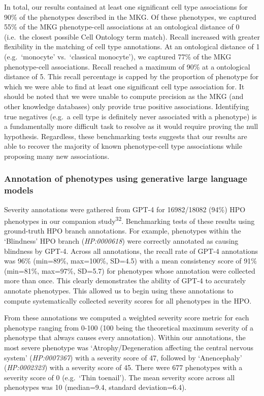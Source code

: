 \documentclass[
]{article}
\begin{document}
In total, our results contained at least one significant cell type
associations for 90\% of the phenotypes described in the MKG. Of these
phenotypes, we captured 55\% of the MKG phenotype-cell associations at
an ontological distance of 0 (i.e.~the closest possible Cell Ontology
term match). Recall increased with greater flexibility in the matching
of cell type annotations. At an ontological distance of 1
(e.g.~`monocyte' vs.~`classical monocyte'), we captured 77\% of the MKG
phenotype-cell associations. Recall reached a maximum of 90\% at a
ontological distance of 5. This recall percentage is capped by the
proportion of phenotype for which we were able to find at least one
significant cell type association for. It should be noted that we were
unable to compute precision as the MKG (and other knowledge databases)
only provide true positive associations. Identifying true negatives
(e.g.~a cell type is definitely never associated with a phenotype) is a
fundamentally more difficult task to resolve as it would require proving
the null hypothesis. Regardless, these benchmarking tests suggests that
our results are able to recover the majority of known phenotype-cell
type associations while proposing many new associations.

\subsubsection{Annotation of phenotypes using generative large language
models}\label{annotation-of-phenotypes-using-generative-large-language-models}

Severity annotations were gathered from GPT-4 for 16982/18082 (94\%) HPO
phenotypes in our companion study\textsuperscript{32}. Benchmarking
tests of these results using ground-truth HPO branch annotations. For
example, phenotypes within the `Blindness' HPO branch
(\emph{HP:0000618}) were correctly annotated as causing blindness by
GPT-4. Across all annotations, the recall rate of GPT-4 annotations was
96\% (min=89\%, max=100\%, SD=4.5) with a mean consistency score of 91\%
(min=81\%, max=97\%, SD=5.7) for phenotypes whose annotation were
collected more than once. This clearly demonstrates the ability of GPT-4
to accurately annotate phenotypes. This allowed us to begin using these
annotations to compute systematically collected severity scores for all
phenotypes in the HPO.

From these annotations we computed a weighted severity score metric for
each phenotype ranging from 0-100 (100 being the theoretical maximum
severity of a phenotype that always causes every annotation). Within our
annotations, the most severe phenotype was `Atrophy/Degeneration
affecting the central nervous system' (\emph{HP:0007367}) with a
severity score of 47, followed by `Anencephaly' (\emph{HP:0002323}) with
a severity score of 45. There were 677 phenotypes with a severity score
of 0 (e.g.~`Thin toenail'). The mean severity score across all
phenotypes was 10 (median=9.4, standard deviation=6.4).
\end{document}
